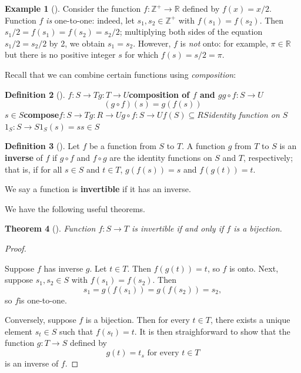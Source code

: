 \documentclass[10pt,]{book}
\newcommand{\terminology}[1]{\textbf{#1}}
\theoremstyle{plain}
\newtheorem{theorem}{Theorem}[section]
\theoremstyle{definition}
\newtheorem{definition}[theorem]{Definition}
\theoremstyle{definition}
\theoremstyle{definition}
\newtheorem{example}[theorem]{Example}
\theoremstyle{definition}
\numberwithin{equation}{section}
\def\Z{\mathbb{Z}}
\def\R{\mathbb{R}}
\begin{document}
\begin{example}[]\label{example-7}
Consider the function \(f: \Z^+ \to \R\) defined by \(f(x)=x/2\). Function \(f\) \emph{is} one-to-one: indeed, let \(s_1, s_2 \in \Z^+\) with \(f(s_1)=f(s_2)\). Then \(s_1/2=f(s_1)=f(s_2)=s_2/2\); multiplying both sides of the equation \(s_1/2=s_2/2\) by 2, we obtain \(s_1=s_2\). However, \(f\) is \emph{not} onto: for example, \(\pi\in \R\) but there is no positive integer \(s\) for which \(f(s)=s/2=\pi\).%
\end{example}
Recall that we can combine certain functions using \emph{composition}:%
\begin{definition}[{}]\label{definition-10}
\(f:S\to T\)\(g:T\to U\)\terminology{composition of \(f\) and \(g\)}\(g\circ f: S\to U\)%
\begin{equation*}
(g\circ f)(s)=g(f(s))
\end{equation*}
\(s\in S\)\terminology{compose}\(f:S\to T\)\(g:R\to U\)\(g\circ f:S\to U\)\(f(S)\subseteq R\)\(S\)\emph{identity function on \(S\)}\(1_S: S\to S\)\(1_S(s)=s\)\(s\in S\)\label{notation-26}
\label{notation-27}
\end{definition}
\begin{definition}[{}]\label{definition-11}
Let \(f\) be a function from \(S\) to \(T\). A function \(g\) from \(T\) to \(S\) is an \terminology{inverse} of \(f\) if \(g\circ f\) and \(f\circ g\) are the identity functions on \(S\) and \(T\), respectively; that is, if for all \(s\in S\) and \(t\in
T\), \(g(f(s))=s\) and \(f(g(t))=t\).%
\par
We say a function is \terminology{invertible} if it has an inverse.%
\end{definition}
We have the following useful theorems.%
\begin{theorem}[{}]\label{invbij}
Function \(f:S\to T\) is invertible if and only if \(f\) is a bijection.%
\end{theorem}
\begin{proof}\hypertarget{proof-1}{}
Suppose \(f\) has inverse \(g\). Let \(t\in T\). Then \(f(g(t))=t\), so \(f\) is onto.  Next, suppose \(s_1,s_2\in S\) with \(f(s_1)=f(s_2)\). Then%
\begin{equation*}
s_1=g(f(s_1))=g(f(s_2))=s_2,
\end{equation*}
so \(f\)is one-to-one.%
\par
Conversely, suppose \(f\) is a bijection.  Then for every \(t\in T\), there exists a unique element \(s_t\in S\) such that \(f(s_t)=t\). It is then straighforward to show that the function \(g:T\to S\) defined by%
\begin{equation*}
g(t)=t_s \text{ for every }t\in T
\end{equation*}
is an inverse of \(f\).%
\end{proof}
\end{document}
